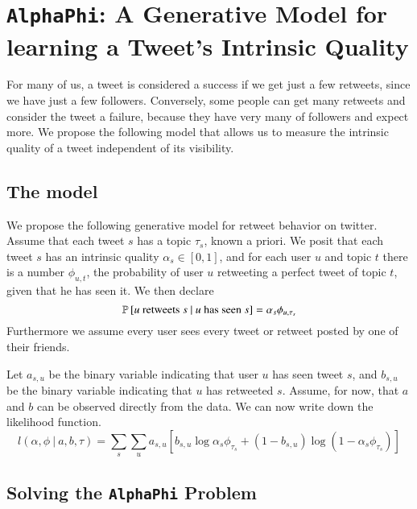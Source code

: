 \section{\texttt{AlphaPhi}: A Generative Model for learning a Tweet's Intrinsic Quality}

For many of us, a tweet is considered a success if we get just a few retweets, since we have just a few followers.
Conversely, some people can get many retweets and consider the tweet a failure, because they have very many of followers and expect more.
We propose the following model that allows us to measure the intrinsic quality of a tweet independent of its visibility.  


\subsection{The model}
We propose the following generative model for retweet behavior on twitter.
Assume that each tweet $s$ has a topic $\tau_s$, known a priori.
We posit that each tweet $s$ has an intrinsic quality $\alpha_s\in [0,1]$, and for each user $u$  and topic $t$ there is a number $\phi_{u,t}$, the probability of user $u$ retweeting a perfect tweet of topic $t$, given that he has seen it.
We then declare
\begin{equation}\label{eq:apeq}
\mathbb{P} \left[\mbox{$u$ retweets $s$}~|~\mbox{$u$ has seen $s$}\right] = \alpha_s\phi_{u,\tau_s}
\end{equation}
Furthermore we assume every user sees every tweet or retweet posted by one of their friends.

Let $a_{s,u}$ be the binary variable indicating that user $u$ has seen tweet $s$, and $b_{s,u}$ be the binary variable indicating that $u$ has retweeted $s$.
Assume, for now, that $a$ and $b$ can be observed directly from the data.
We can now write down the likelihood function.
\begin{equation} \label{eq:aplikelihood}
l(\alpha,\phi~|~a,b,\tau) = \sum_s\sum_u a_{s,u} \left[b_{s,u}\log\alpha_s\phi_{\tau_s} + (1-b_{s,u})\log(1-\alpha_s\phi_{\tau_s})\right]
\end{equation}


\subsection{Solving the \texttt{AlphaPhi} Problem}

